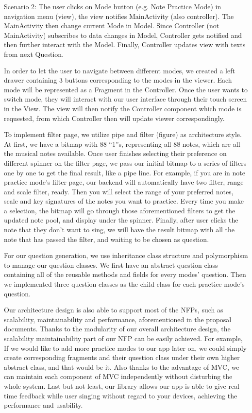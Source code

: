 \documentclass{article}
\begin{document}
Scenario 2:
The user clicks on Mode button (e.g. Note Practice Mode) in navigation menu (view), the view notifies MainActivity (also controller). The MainActivity then change current Mode in Model. Since Controller (not MainActivity) subscribes to data changes in Model, Controller gets notified and then further interact with the Model. Finally, Controller updates view with texts from next Question.


In order to let the user to navigate between different modes, we created a left drawer containing 3 buttons corresponding to the modes in the viewer. Each mode will be represented as a Fragment in the Controller. Once the user wants to switch mode, they will interact with our user interface through their touch screen in the View. The view will then notify the Controller component which mode is requested, from which Controller then will update viewer correspondingly.


To implement filter page, we utilize pipe and filter (figure) as architecture style. At first, we have a bitmap with 88 “1”s, representing all 88 notes, which are all the musical notes available. Once user finishes selecting their preference on different spinner on the filter page, we pass our initial bitmap to a series of filters one by one to get the final result, like a pipe line. For example, if you are in note practice mode’s filter page, our backend will automatically have two filter, range and scale filter, ready. Then you will select the range of your preferred notes, scale and key signatures of the notes you want to practice. Every time you make a selection, the bitmap will go through those aforementioned filters to get the updated note pool, and display under the spinner. Finally, after user clicks the note that they don’t want to sing, we will have the result bitmap with all the note that has passed the filter, and waiting to be chosen as question.


For our question generation, we use inheritance class structure and polymorphism to manage our question classes. We first have an abstract question class containing all of the reusable methods and fields for every modes’ question. Then we implemented three question classes as the child class for each practice mode’s question. 
 

Our architecture design is also able to support most of the NFPs, such as scalability, maintainability and performance, aforementioned in the proposal documents. Thanks to the modularity of our overall architecture design, the scalability maintainability part of our NFP can be easily achieved. For example, If we would like to add more practice modes to our app later on, we could simply create corresponding fragments and their question class under their own higher abstract class, and that would be it. Also thanks to the advantage of MVC, we can maintain each component of MVC independently without disturbing the whole system. Last but not least, our library allows our app is able to give real-time feedback while user singing without regard to your devices, achieving the performance and usability.
\end{document}
